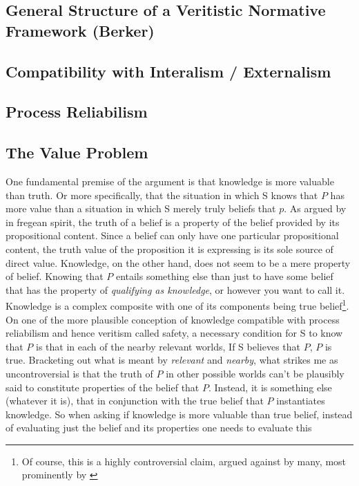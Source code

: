 \documentclass[12pt,numbers=noenddot]{scrartcl}
\begin{document}
\subsection{General Structure of a Veritistic Normative Framework (Berker)}
\subsection{Compatibility with Interalism / Externalism}
\subsection{Process Reliabilism}


\subsection{The Value Problem}

One fundamental premise of the argument is that knowledge is more valuable than truth. Or more specifically, that the situation in which S knows that $P$ has more value than a situation in which S merely truly beliefs that $p$. As argued by \textcite[35-38]{grundmann2008} in fregean spirit, the truth of a belief is a property of the belief provided by its propositional content. Since a belief can only have one particular propositional content, the truth value of the proposition it is expressing is its sole source of direct value. Knowledge, on the other hand, does not seem to be a mere property of belief. Knowing that $P$ entails something else than just to have some belief that has the property of \emph{qualifying as knowledge}, or however you want to call it. Knowledge is a complex composite with one of its components being true belief\footnote{Of course, this is a highly controversial claim, argued against by many, most prominently by \textcite{Williamson2000-WILKAI}}. On one of the more plausible conception of knowledge compatible with process reliabilism and hence veritism called safety, a necessary condition for S to know that $P$ is that in each of the nearby relevant worlds, If S believes that $P$, $P$ is true. Bracketing out what is meant by \emph{relevant} and \emph{nearby}, what strikes me as uncontroversial is that the truth of $P$ in other possible worlds can't be plausibly said to constitute properties of the belief that $P$. Instead, it is something else (whatever it is), that in conjunction with the true belief that $P$ instantiates knowledge. So when asking if knowledge is more valuable than true belief, instead of evaluating just the belief and its properties one needs to evaluate this
\end{document}
